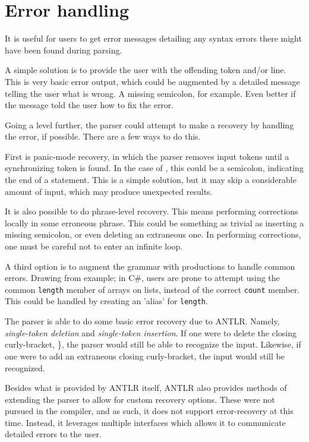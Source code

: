 \section{Error handling}
It is useful for users to get error messages detailing any syntax errors there might have been found during parsing.

A simple solution is to provide the user with the offending token and/or line. This is very basic error output, which could be augmented by a detailed message telling the user what is wrong. A missing semicolon, for example. Even better if the message told the user how to fix the error. 

Going a level further, the parser could attempt to make a recovery by handling the error, if possible. There are a few ways to do this.

First is panic-mode recovery, in which the parser removes input tokens until a synchronizing token is found. In the case of \dazel{}, this could be a semicolon, indicating the end of a statement. This is a simple solution, but it may skip a considerable amount of input, which may produce unexpected results\cite{crafting_a_compiler}.

It is also possible to do phrase-level recovery. This means performing corrections locally in some erroneous phrase. This could be something as trivial as inserting a missing semicolon, or even deleting an extraneous one. In performing corrections, one must be careful not to enter an infinite loop\cite{spo_course}.

A third option is to augment the grammar with productions to handle common errors\cite{spo_course}. Drawing from example; in C\#, users are prone to attempt using the common \texttt{length} member of arrays on lists, instead of the correct \texttt{count} member. This could be handled by creating an 'alias' for \texttt{length}.

The \dazel{} parser is able to do some basic error recovery due to ANTLR. Namely, \textit{single-token deletion} and \textit{single-token insertion}. If one were to delete the closing curly-bracket, \}, the parser would still be able to recognize the input. Likewise, if one were to add an extraneous closing curly-bracket, the input would still be recognized.

Besides what is provided by ANTLR itself, ANTLR also provides methods of extending the parser to allow for custom recovery options. These were not pursued in the \dazel{} compiler, and as such, it does not support error-recovery at this time. Instead, it leverages multiple interfaces which allows it to communicate detailed errors to the user.

